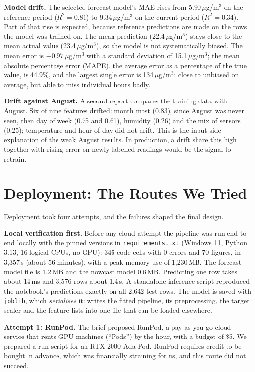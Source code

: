 \documentclass{ieeeaccess}
\newcommand{\ugm}{\,$\mu$g/m$^{3}$}
\begin{document}
\textbf{Model drift.} The selected forecast model's MAE rises from 5.90\ugm{} on the reference period ($R^2 = 0.81$) to 9.34\ugm{} on the current period ($R^2 = 0.34$). Part of that rise is expected, because reference predictions are made on the rows the model was trained on. The mean prediction (22.4\ugm) stays close to the mean actual value (23.4\ugm), so the model is not systematically biased. The mean error is $-0.97$\ugm{} with a standard deviation of 15.1\ugm{}; the mean absolute percentage error (MAPE), the average error as a percentage of the true value, is 44.9\%, and the largest single error is 134\ugm{}: close to unbiased on average, but able to miss individual hours badly.

\textbf{Drift against August.} A second report compares the training data with August. Six of nine features drifted: month most (0.83), since August was never seen, then day of week (0.75 and 0.61), humidity (0.26) and the mix of sensors (0.25); temperature and hour of day did not drift. This is the input-side explanation of the weak August results. In production, a drift share this high together with rising error on newly labelled readings would be the signal to retrain.

\section{Deployment: The Routes We Tried}
\label{sec:deploy}

Deployment took four attempts, and the failures shaped the final design.

\textbf{Local verification first.} Before any cloud attempt the pipeline was run end to end locally with the pinned versions in \texttt{requirements.txt} (Windows 11, Python 3.13, 16 logical CPUs, no GPU): 346 code cells with 0 errors and 70 figures, in 3{,}357\,s (about 56 minutes), with a peak memory use of 1{,}230\,MB. The forecast model file is 1.2\,MB and the nowcast model 0.6\,MB. Predicting one row takes about 14\,ms and 3{,}576 rows about 1.4\,s. A standalone inference script reproduced the notebook's predictions exactly on all 2{,}642 test rows. The model is saved with \texttt{joblib}, which \emph{serialises} it: writes the fitted pipeline, its preprocessing, the target scaler and the feature lists into one file that can be loaded elsewhere.

\textbf{Attempt 1: RunPod.} The brief proposed RunPod, a pay-as-you-go cloud service that rents GPU machines (``Pods'') by the hour, with a budget of \$5. We prepared a run script for an RTX 2000 Ada Pod. RunPod requires credit to be bought in advance, which was financially straining for us, and this route did not succeed.
\end{document}
